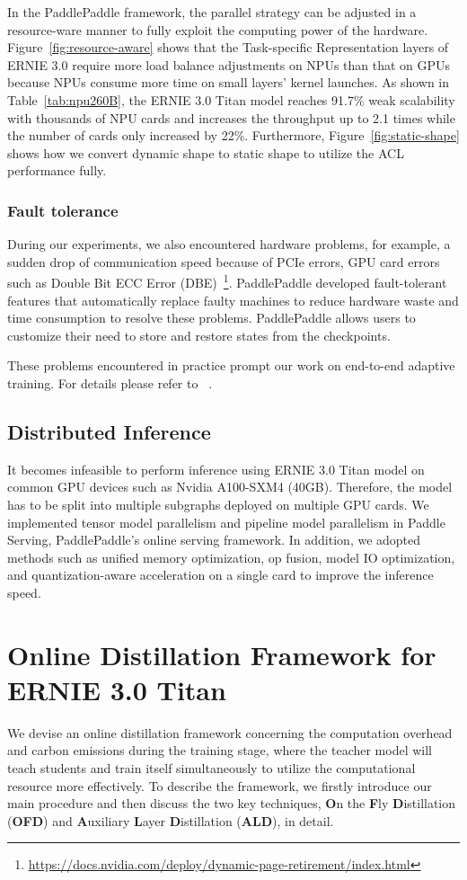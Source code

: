 In the PaddlePaddle framework, the parallel strategy can be adjusted in a resource-ware manner to fully exploit the computing power of the hardware. Figure~\ref{fig:resource-aware} shows that the Task-specific Representation layers of ERNIE 3.0 require more load balance adjustments on NPUs than that on GPUs because NPUs consume more time on small layers' kernel launches. As shown in Table~\ref{tab:npu260B}, the ERNIE 3.0 Titan model reaches 91.7\% weak scalability with thousands of NPU cards and increases the throughput up to 2.1 times while the number of cards only increased by 22\%. Furthermore,  Figure~\ref{fig:static-shape} shows how we convert dynamic shape to static shape to utilize the ACL performance fully.

\subsubsection{Fault tolerance} During our experiments, we also encountered hardware problems, for example, a sudden drop of communication speed because of PCIe errors, GPU card errors such as Double Bit ECC Error (DBE)~\footnote{\url{https://docs.nvidia.com/deploy/dynamic-page-retirement/index.html}}. PaddlePaddle developed fault-tolerant features that automatically replace faulty machines to reduce hardware waste and time consumption to resolve these problems. PaddlePaddle allows users to customize their need to store and restore states from the checkpoints.

These problems encountered in practice prompt our work on end-to-end adaptive training. For details please refer to ~\cite{ao2021endtoend}.

\subsection{Distributed Inference} It becomes infeasible to perform inference using ERNIE 3.0 Titan model on common GPU devices such as Nvidia A100-SXM4 (40GB). Therefore, the model has to be split into multiple subgraphs deployed on multiple GPU cards. We implemented tensor model parallelism and pipeline model parallelism in Paddle Serving, PaddlePaddle's online serving framework. In addition, we adopted methods such as unified memory optimization, op fusion, model IO optimization, and quantization-aware acceleration on a single card to improve the inference speed. 

\section{Online Distillation Framework for ERNIE 3.0 Titan}\label{sec:distill} 
We devise an online distillation framework concerning the computation overhead and carbon emissions during the training stage, where the teacher model will teach students and train itself simultaneously to utilize the computational resource more effectively. To describe the framework, we firstly introduce our main procedure and then discuss the two key techniques, \textbf{O}n the \textbf{F}ly \textbf{D}istillation (\textbf{OFD}) and \textbf{A}uxiliary \textbf{L}ayer \textbf{D}istillation (\textbf{ALD}), in detail.

